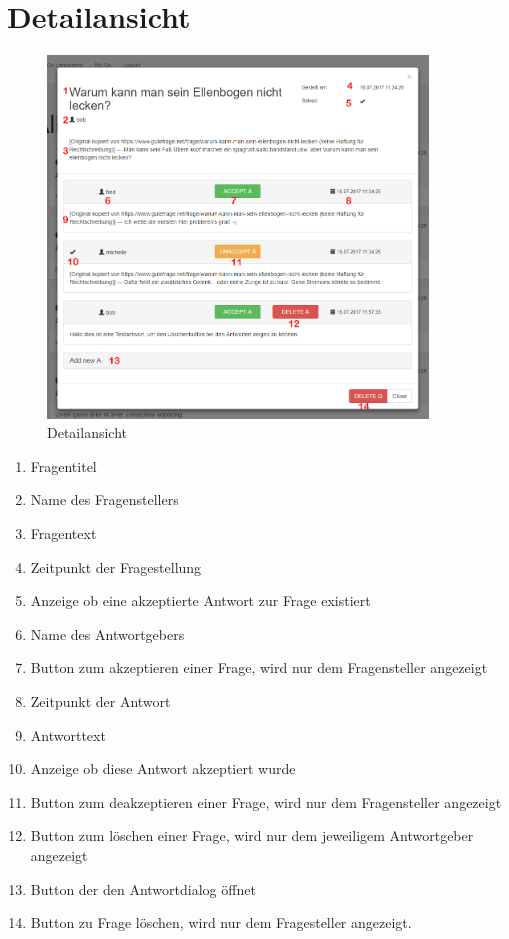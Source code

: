 \documentclass[a4paper]{report}
\begin{document}
\section{Detailansicht}
\begin{figure}[h!]
	\centering
	\includegraphics[width=0.9\textwidth]{./Bilder/FrageMitAntworten.PNG}
	\caption{Detailansicht}
	\label{fig:Detailansicht1}
\end{figure}
\centering\begin{enumerate}
	\item Fragentitel
	\item Name des Fragenstellers
	\item Fragentext
	\item Zeitpunkt der Fragestellung
	\item Anzeige ob eine akzeptierte Antwort zur Frage existiert
	\item Name des Antwortgebers
	\item Button zum akzeptieren einer Frage, wird nur dem Fragensteller angezeigt
	\item Zeitpunkt der Antwort
	\item Antworttext
	\item Anzeige ob diese Antwort akzeptiert wurde
	\item Button zum deakzeptieren einer Frage, wird nur dem Fragensteller angezeigt
	\item Button zum löschen einer Frage, wird nur dem jeweiligem Antwortgeber angezeigt
	\item Button der den Antwortdialog öffnet
	\item Button zu Frage löschen, wird nur dem Fragesteller angezeigt. 
\end{enumerate}
\end{document}
